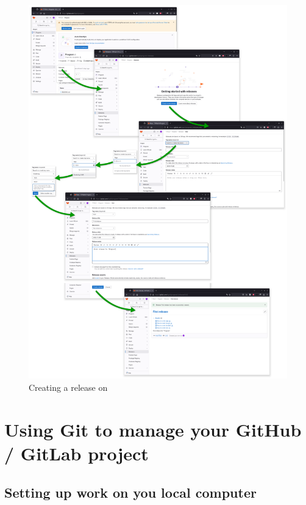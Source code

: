 \begin{figure}[!p]
\includegraphics[width=1.0\textwidth,keepaspectratio=true,draft=\ddst]{img/hosts/gitlab/release.eps} 
\caption{Creating a release on \gitlab\label{rgitlab}}
\end{figure}

\clearpage

\section{Using Git to manage your GitHub / GitLab project}
\label{onlinegit}

\subsection{Setting up work on you local computer} 

